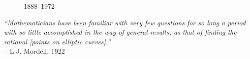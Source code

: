 {\begin{frame}[plain]
\begin{minipage}{0.2\textwidth}
\begin{figure}[h]
	 \par
	{\small 1888--1972}
	\end{figure}
	\end{minipage}%
	\begin{minipage}{0.8\textwidth}
	\begin{center}
	{\itshape ``Mathematicians have been familiar with very few questions for so long a period with so little accomplished in the way of general results, as that of finding the rational [points on elliptic curves].''} \\
	 \phantom{x}\hfill-- L.J. Mordell, 1922
	\end{center}
 	\end{minipage}
\end{frame}
}



